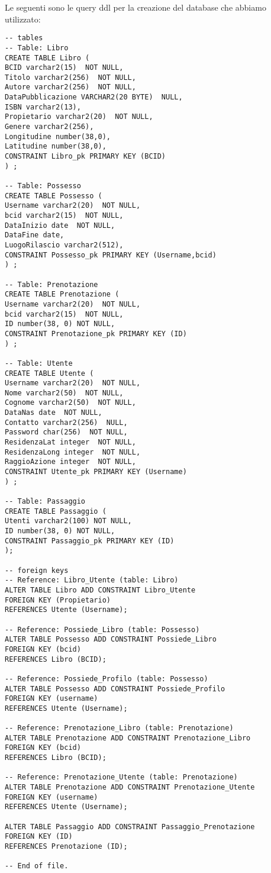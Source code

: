 Le seguenti sono le query ddl per la creazione del database che abbiamo utilizzato:
\begin{lstlisting}
-- tables
-- Table: Libro
CREATE TABLE Libro (
BCID varchar2(15)  NOT NULL,
Titolo varchar2(256)  NOT NULL,
Autore varchar2(256)  NOT NULL,
DataPubblicazione VARCHAR2(20 BYTE)  NULL,
ISBN varchar2(13),
Propietario varchar2(20)  NOT NULL,
Genere varchar2(256),
Longitudine number(38,0),
Latitudine number(38,0),
CONSTRAINT Libro_pk PRIMARY KEY (BCID)
) ;

-- Table: Possesso
CREATE TABLE Possesso (
Username varchar2(20)  NOT NULL,
bcid varchar2(15)  NOT NULL,
DataInizio date  NOT NULL,
DataFine date,
LuogoRilascio varchar2(512),
CONSTRAINT Possesso_pk PRIMARY KEY (Username,bcid)
) ;

-- Table: Prenotazione
CREATE TABLE Prenotazione (
Username varchar2(20)  NOT NULL,
bcid varchar2(15)  NOT NULL,
ID number(38, 0) NOT NULL,
CONSTRAINT Prenotazione_pk PRIMARY KEY (ID)
) ;

-- Table: Utente
CREATE TABLE Utente (
Username varchar2(20)  NOT NULL,
Nome varchar2(50)  NOT NULL,
Cognome varchar2(50)  NOT NULL,
DataNas date  NOT NULL,
Contatto varchar2(256)  NULL,
Password char(256)  NOT NULL,
ResidenzaLat integer  NOT NULL,
ResidenzaLong integer  NOT NULL,
RaggioAzione integer  NOT NULL,
CONSTRAINT Utente_pk PRIMARY KEY (Username)
) ;

-- Table: Passaggio
CREATE TABLE Passaggio (
Utenti varchar2(100) NOT NULL,
ID number(38, 0) NOT NULL,
CONSTRAINT Passaggio_pk PRIMARY KEY (ID)
);

-- foreign keys
-- Reference: Libro_Utente (table: Libro)
ALTER TABLE Libro ADD CONSTRAINT Libro_Utente
FOREIGN KEY (Propietario)
REFERENCES Utente (Username);

-- Reference: Possiede_Libro (table: Possesso)
ALTER TABLE Possesso ADD CONSTRAINT Possiede_Libro
FOREIGN KEY (bcid)
REFERENCES Libro (BCID);

-- Reference: Possiede_Profilo (table: Possesso)
ALTER TABLE Possesso ADD CONSTRAINT Possiede_Profilo
FOREIGN KEY (username)
REFERENCES Utente (Username);

-- Reference: Prenotazione_Libro (table: Prenotazione)
ALTER TABLE Prenotazione ADD CONSTRAINT Prenotazione_Libro
FOREIGN KEY (bcid)
REFERENCES Libro (BCID);

-- Reference: Prenotazione_Utente (table: Prenotazione)
ALTER TABLE Prenotazione ADD CONSTRAINT Prenotazione_Utente
FOREIGN KEY (username)
REFERENCES Utente (Username);

ALTER TABLE Passaggio ADD CONSTRAINT Passaggio_Prenotazione 
FOREIGN KEY (ID)
REFERENCES Prenotazione (ID);

-- End of file.


\end{lstlisting}
